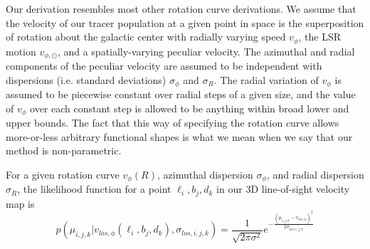 Our derivation resembles most other rotation curve derivations. We assume that the velocity of our tracer population at a given point in space is the superposition of rotation about the galactic center with radially varying speed $v_\phi$, the LSR motion $v_{\phi, \odot}$, and a spatially-varying peculiar velocity. The azimuthal and radial components of the peculiar velocity are assumed to be independent with dispersions (i.e. standard deviations) $\sigma_\phi$ and $\sigma_R$. The radial variation of $v_\phi$ is assumed to be piecewise constant over radial steps of a given size, and the value of $v_\phi$ over each constant step is allowed to be anything within broad lower and upper bounds. The fact that this way of specifying the rotation curve allows more-or-less arbitrary functional shapes is what we mean when we say that our method is non-parametric.

For a given rotation curve $v_\phi(R)$, azimuthal dispersion $\sigma_\phi$, and radial dispersion $\sigma_R$, the likelihood function for a point $\ell_i,b_j,d_k$ in our 3D line-of-sight velocity map is 
\begin{equation}
\label{eqn:rotcuve_likelihood}
p(\mu_{i,j,k} \vert v_{los, \phi}(\ell_i, b_j, d_k), \sigma_{los, i, j, k}) = \frac{1}{\sqrt{2 \pi \sigma^2}} e^{- \frac{(\mu_{i,j,k} - v_{los, \phi})^2}{2 \sigma_{los, i, j ,k}}}
\end{equation}

